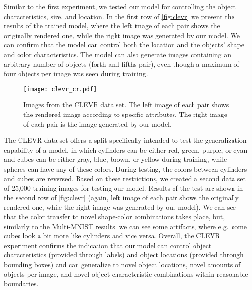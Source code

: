 \documentclass{article} \usepackage{iclr2019_conference,times}
\begin{document}
	Similar to the first experiment, we tested our model for controlling the object characteristics, size, and location.
	In the first row of \autoref{fig:clevr} we present the results of the trained model, where the left image of each pair shows the originally rendered one, while the right image was generated by our model.
	We can confirm that the model can control both the location and the objects' shape and color characteristics.
	The model can also generate images containing an arbitrary number of objects (forth and fifths pair), even though a maximum of four objects per image was seen during training.
\begin{figure}[tb]
		\centering
		\texttt{[image: clevr\_cr.pdf]}
		\caption{Images from the CLEVR data set. The left image of each pair shows the rendered image according to specific attributes. The right image of each pair is the image generated by our model.}
		\label{fig:clevr}
	\end{figure}
	
	The CLEVR data set offers a split specifically intended to test the generalization capability of a model, in which cylinders can be either red, green, purple, or cyan and cubes can be either gray, blue, brown, or yellow during training, while spheres can have any of these colors.
	During testing, the colors between cylinders and cubes are reversed.
	Based on these restrictions, we created a second data set of 25,000 training images for testing our model.
	Results of the test are shown in the second row of \autoref{fig:clevr} (again, left image of each pair shows the originally rendered one, while the right image was generated by our model).
	We can see that the color transfer to novel shape-color combinations takes place, but, similarly to the Multi-MNIST results, we can see some artifacts, where e.g.\ some cubes look a bit more like cylinders and vice versa.
	Overall, the CLEVR experiment confirms the indication that our model can control object characteristics (provided through labels) and object locations (provided through bounding boxes) and can generalize to novel object locations, novel amounts of objects per image, and novel object characteristic combinations within reasonable boundaries.
	
\end{document}
